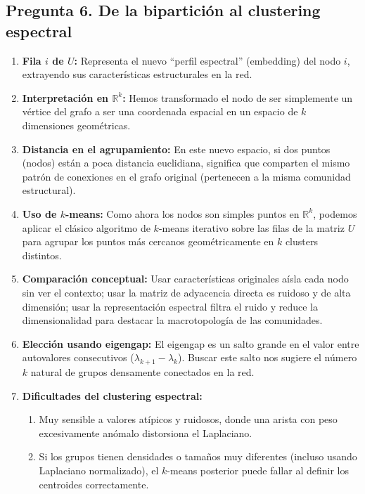 \documentclass{article}
\begin{document}
	\subsection*{Pregunta 6. De la bipartición al clustering espectral}
	\begin{enumerate}[label=\alph*)]
		\item \textbf{Fila \(i\) de \(U\):} Representa el nuevo ``perfil espectral'' (embedding) del nodo \(i\), extrayendo sus características estructurales en la red.
		
		\item \textbf{Interpretación en \(\mathbb{R}^k\):} Hemos transformado el nodo de ser simplemente un vértice del grafo a ser una coordenada espacial en un espacio de \(k\) dimensiones geométricas.
		
		\item \textbf{Distancia en el agrupamiento:} En este nuevo espacio, si dos puntos (nodos) están a poca distancia euclidiana, significa que comparten el mismo patrón de conexiones en el grafo original (pertenecen a la misma comunidad estructural).
		
		\item \textbf{Uso de \(k\)-means:} Como ahora los nodos son simples puntos en \(\mathbb{R}^k\), podemos aplicar el clásico algoritmo de \(k\)-means iterativo sobre las filas de la matriz \(U\) para agrupar los puntos más cercanos geométricamente en \(k\) clusters distintos.
		
		\item \textbf{Comparación conceptual:} Usar características originales aísla cada nodo sin ver el contexto; usar la matriz de adyacencia directa es ruidoso y de alta dimensión; usar la representación espectral filtra el ruido y reduce la dimensionalidad para destacar la macrotopología de las comunidades.
		
		\item \textbf{Elección usando eigengap:} El eigengap es un salto grande en el valor entre autovalores consecutivos (\(\lambda_{k+1} - \lambda_k\)). Buscar este salto nos sugiere el número \(k\) natural de grupos densamente conectados en la red.
		
		\item \textbf{Dificultades del clustering espectral:}
		\begin{enumerate}[label=\arabic*.]
			\item Muy sensible a valores atípicos y ruidosos, donde una arista con peso excesivamente anómalo distorsiona el Laplaciano.
			\item Si los grupos tienen densidades o tamaños muy diferentes (incluso usando Laplaciano normalizado), el \(k\)-means posterior puede fallar al definir los centroides correctamente.
		\end{enumerate}
	\end{enumerate}
	
\end{document}
